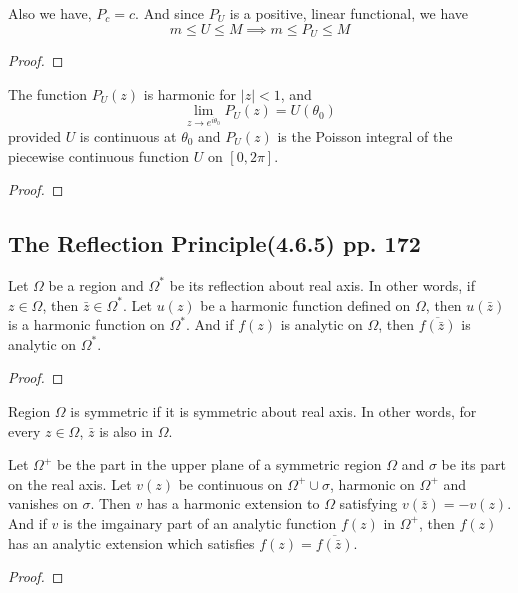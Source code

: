 \begin{remark}
	Also we have, $P_c = c$. And since $P_U$ is a positive, linear functional, we have
	\[m \le U \le M \implies m \le P_U \le M\]
\end{remark}
\begin{proof}
\end{proof}

\begin{theorem}[Schwarz]
	The function $P_U(z)$ is harmonic for $|z|<1$, and
	\begin{equation}
		\lim_{z \to e^{i\theta_0}} P_U(z) = U(\theta_0)
	\end{equation}
	provided $U$ is continuous at $\theta_0$ and $P_U(z)$ is the Poisson integral of the piecewise continuous function $U$ on $[0,2\pi]$.
\end{theorem}
\begin{proof}
\end{proof}

\subsection{The Reflection Principle(4.6.5) pp. 172}
\begin{remark}
	Let $\Omega$ be a region and $\Omega^\ast$ be its reflection about real axis.
	In other words, if $z \in \Omega$, then $\bar{z} \in \Omega^\ast$.
	Let $u(z)$ be a harmonic function defined on $\Omega$, then $u(\bar{z})$ is a harmonic function on $\Omega^\ast$.
	And if $f(z)$ is analytic on $\Omega$, then $\overline{f(\bar{z})}$ is analytic on $\Omega^\ast$.
\end{remark}
\begin{proof}
\end{proof}

\begin{definition}
	Region $\Omega$ is symmetric if it is symmetric about real axis.
	In other words, for every $z \in \Omega$, $\bar{z}$ is also in $\Omega$.
\end{definition}

\begin{theorem}
	Let $\Omega^+$ be the part in the upper plane of a symmetric region $\Omega$ and $\sigma$ be its part on the real axis.
	Let $v(z)$ be continuous on $\Omega^+ \cup \sigma$, harmonic on $\Omega^+$ and vanishes on $\sigma$.
	Then $v$ has a harmonic extension to $\Omega$ satisfying $v(\bar{z}) = -v(z)$.
	And if $v$ is the imgainary part of an analytic function $f(z)$ in $\Omega^+$, then $f(z)$ has an analytic extension which satisfies $f(z) = \overline{f(\bar{z})}$.
\end{theorem}
\begin{proof}
\end{proof}

